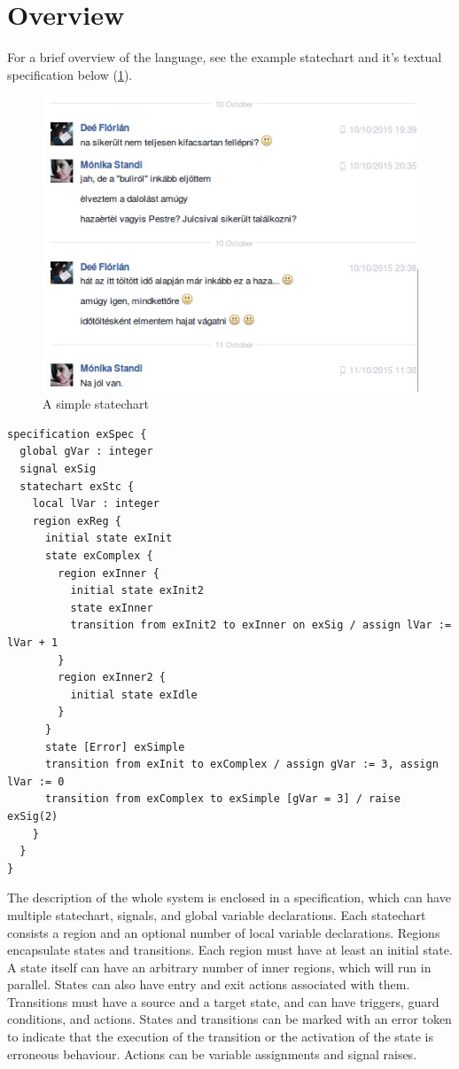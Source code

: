 \section{Overview}
For a brief overview of the language, see the example statechart and it's textual specification below (\cref{fig:verif}).
\begin{figure}[H]
	\centering
	\includegraphics[width=0.65\linewidth]{include/figures/chapter_4/stcex}
	\caption{A simple statechart}
	\label{fig:verif}
\end{figure}
\begin{verbatim}
specification exSpec {
  global gVar : integer
  signal exSig
  statechart exStc {
    local lVar : integer
    region exReg {
      initial state exInit
      state exComplex {
        region exInner {
          initial state exInit2
          state exInner
          transition from exInit2 to exInner on exSig / assign lVar := lVar + 1
        }
        region exInner2 {
          initial state exIdle
        }
      }
      state [Error] exSimple
      transition from exInit to exComplex / assign gVar := 3, assign lVar := 0
      transition from exComplex to exSimple [gVar = 3] / raise exSig(2)
    }
  }
}
\end{verbatim}
The description of the whole system is enclosed in a specification, which can have multiple statechart, signals, and global variable declarations. Each statechart consists a region and an optional number of local variable declarations. Regions encapsulate states and transitions. Each region must have at least an initial state. A state itself can have an arbitrary number of inner regions, which will run in parallel. States can also have entry and exit actions associated with them. Transitions must have a source and a target state, and can have triggers, guard conditions, and actions. States and transitions can be marked with an error token to indicate that the execution of the transition or the activation of the state is erroneous behaviour. Actions can be variable assignments and signal raises.
